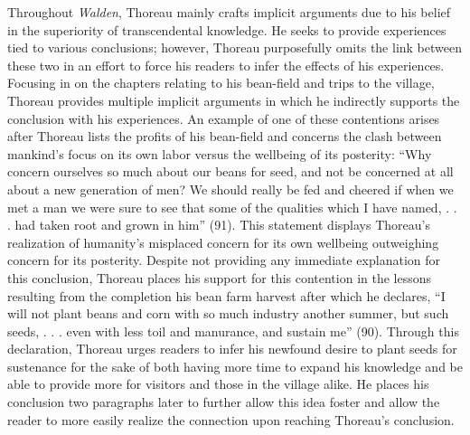 \documentclass[12pt]{article}
\newcommand{\tq}[2]{
    \fancyhead[L]{\emph{Walden}: Reading Journals}
    \fancyhead[R]{TQ:\ #1 $\vert$ CH: #2}
}
\begin{document}
Throughout \emph{Walden}, Thoreau mainly crafts implicit arguments due to his belief in the superiority of transcendental knowledge. He seeks to provide experiences tied to various conclusions; however, Thoreau purposefully omits the link between these two in an effort to force his readers to infer the effects of his experiences. Focusing in on the chapters relating to his bean-field and trips to the village, Thoreau provides multiple implicit arguments in which he indirectly supports the conclusion with his experiences. An example of one of these contentions arises after Thoreau lists the profits of his bean-field and concerns the clash between mankind's focus on its own labor versus the wellbeing of its posterity: ``Why concern ourselves so much about our beans for seed, and not be concerned at all about a new generation of men? We should really be fed and cheered if when we met a man we were sure to see that some of the qualities which I have named, . . . had taken root and grown in him'' (91). This statement displays Thoreau's realization of humanity's misplaced concern for its own wellbeing outweighing concern for its posterity. Despite not providing any immediate explanation for this conclusion, Thoreau places his support for this contention in the lessons resulting from the completion his bean farm harvest after which he declares, ``I will not plant beans and corn with so much industry another summer, but such seeds, . . . even with less toil and manurance, and sustain me'' (90). Through this declaration, Thoreau urges readers to infer his newfound desire to plant seeds for sustenance for the sake of both having more time to expand his knowledge and be able to provide more for visitors and those in the village alike. He places his conclusion two paragraphs later to further allow this idea foster and allow the reader to more easily realize the connection upon reaching Thoreau's conclusion.

\newpage
\tq{9}{9 - The Ponds}

\end{document}

